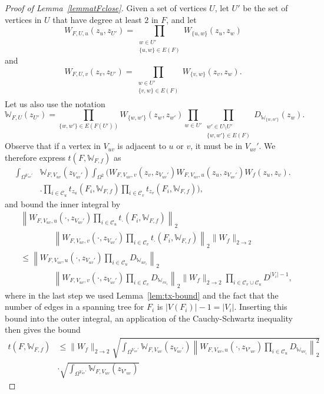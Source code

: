 \documentclass{amsart}
\numberwithin{equation}{section}
\numberwithin{figure}{section}
\theoremstyle{definition}
\theoremstyle{remark}
\newcommand{\cW}{\mathbb{W}}
\newcommand{\cC}{\mathcal{C}}
\begin{document}
\begin{proof}[Proof of Lemma~\ref{lemmatFclose}]
Given a set of vertices $U$, let $U'$ be the set of vertices in $U$ that have
degree at least $2$ in $F$, and let
\[
W_{F,U,u}(z_u,z_{U'})
=\prod_{\substack{w \in {U'}\\ \{u,w\} \in E(F)} }
W_{\{u,w\}}(z_u,z_w)
\]
and
\[
W_{F,U,v}(z_v,z_{U'})=\prod_{\substack{w \in {U'}\\ \{v,w\} \in E(F)\\}} W_{\{v,w\}}(z_v,z_w)
.
\]
Let us also use the notation
\[
\cW_{{F,U}}(z_{U'})=
\prod_{\{w,w'\} \in E(F(U'))}W_{\{w,w'\}}(z_{w},z_{w'})
{\prod_{w\in U'}}
\prod_{\substack{w' \in U \setminus U'\\\{w,w'\} \in E(F)}} D_{\cW_{\{w,w'\}}}(z_w).
\]
Observe that if a vertex in $V_{uv}$ is adjacent to $u$ or $v$, it must be in
$V_{uv}'$. We therefore express $t(F,\cW_{F,f})$ as
\begin{align*}
\int_{\Omega^{{V_{uv}'}}} &\cW_{{F,V_{uv}}}(z_{V_{uv}'})
\int_{\Omega^2} \Biggl(W_{F,V_{uv},v}(z_v,z_{{V_{uv}'}}) W_{F,V_{uv},u}(z_u,z_{{V_{uv}'}})W_f(z_u,z_v)
\Biggr.
\\
&\Biggl.\prod_{i \in \cC_u} t_{z_u}(F_i,\cW_{F,f})
\prod_{i \in \cC_v} t_{z_v}(F_i,\cW_{F,f})\Biggr),
\end{align*}
and bound the inner integral by
\begin{align*}
&
\left\|W_{F,V_{uv},u}({\cdot},z_{V_{uv}'})
\prod_{i \in \cC_u} t_{\cdot}(F_i,\cW_{F,f})\right\|_2\\
& \qquad \qquad
\left\|W_{F,V_{uv},v}({\cdot},z_{V_{uv}'})
\prod_{i \in \cC_v} t_{\cdot}(F_i,\cW_{F,f})\right\|_2\|W_f\|_{2 \rightarrow 2}
\\
&\leq
\left\|W_{F,V_{uv},u}({\cdot},z_{V_{uv}'})
\prod_{i \in \cC_u} D_{\cW_{uv_i}}\right\|_2\\
& \qquad \qquad
\left\|W_{F,V_{uv},v}({\cdot},z_{V_{uv}'})
\prod_{i \in \cC_v} D_{\cW_{vv_i}}\right\|_2
\|W_f\|_{2 \rightarrow 2}\prod_{i\in \cC_v\cup\cC_u} D^{|V_i|-1},
\end{align*}
where in the last step we used Lemma~\ref{lem:tx-bound} and the fact that the
number of edges in a spanning tree for $F_i$ is $|V(F_i)|-1=|V_i|$. Inserting
this bound into the outer integral, an application of the Cauchy-Schwartz
inequality then gives the bound
\begin{align*}
t(F,\cW_{F,f})&\le
\|W_f\|_{2 \rightarrow 2}
\sqrt{\int_{\Omega^{V_{uv}'}} \cW_{{F,V_{uv}}}(z_{V_{uv}'})
\left\|W_{F,V_{uv},u}({\cdot},z_{V'_{uv}})
\prod_{i \in \cC_u} D_{\cW_{uv_i}}\right\|_2^2}
\\
&\cdot
\sqrt{\int_{\Omega^{{V_{uv}'}}}\cW_{{F,V_{uv}}}(z_{V'_{uv}})
}
\end{align*}
\end{proof}
\end{document}
